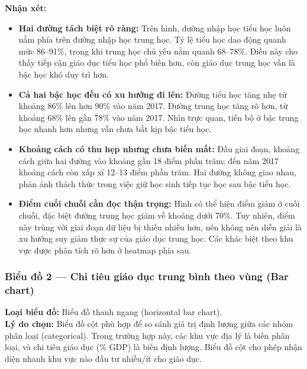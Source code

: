 \textbf{Nhận xét:}
\begin{itemize}
    \item \textbf{Hai đường tách biệt rõ ràng:} Trên hình, đường nhập học tiểu học luôn nằm phía trên đường nhập học trung học. Tỷ lệ tiểu học dao động quanh mức 86--91\%, trong khi trung học chủ yếu nằm quanh 68--78\%. Điều này cho thấy tiếp cận giáo dục tiểu học phổ biến hơn, còn giáo dục trung học vẫn là bậc học khó duy trì hơn.
    \item \textbf{Cả hai bậc học đều có xu hướng đi lên:} Đường tiểu học tăng nhẹ từ khoảng 86\% lên hơn 90\% vào năm 2017. Đường trung học tăng rõ hơn, từ khoảng 68\% lên gần 78\% vào năm 2017. Nhìn trực quan, tiến bộ ở bậc trung học nhanh hơn nhưng vẫn chưa bắt kịp bậc tiểu học.
    \item \textbf{Khoảng cách có thu hẹp nhưng chưa biến mất:} Đầu giai đoạn, khoảng cách giữa hai đường vào khoảng gần 18 điểm phần trăm; đến năm 2017 khoảng cách còn xấp xỉ 12--13 điểm phần trăm. Hai đường không giao nhau, phản ánh thách thức trong việc giữ học sinh tiếp tục học sau bậc tiểu học.
    \item \textbf{Điểm cuối chuỗi cần đọc thận trọng:} Hình có thể hiện điểm giảm ở cuối chuỗi, đặc biệt đường trung học giảm về khoảng dưới 70\%. Tuy nhiên, điểm này trùng với giai đoạn dữ liệu bị thiếu nhiều hơn, nên không nên diễn giải là xu hướng suy giảm thực sự của giáo dục trung học. Các khác biệt theo khu vực được phân tích rõ hơn ở heatmap phía sau.
\end{itemize}

\subsubsection{Biểu đồ 2 --- Chi tiêu giáo dục trung bình theo vùng (Bar chart)}

\textbf{Loại biểu đồ:} Biểu đồ thanh ngang (horizontal bar chart).\\
\textbf{Lý do chọn:} Biểu đồ cột phù hợp để so sánh giá trị định lượng giữa các nhóm phân loại (categorical). Trong trường hợp này, các khu vực địa lý là biến phân loại, và chi tiêu giáo dục (\% GDP) là biến định lượng. Biểu đồ cột cho phép nhận diện nhanh khu vực nào đầu tư nhiều/ít cho giáo dục.


